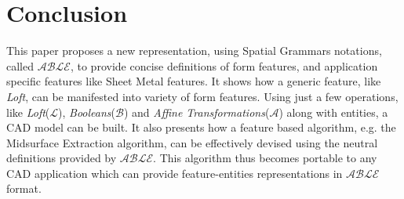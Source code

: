 \section{Conclusion}

This paper proposes a new representation, using Spatial Grammars notations, called {\bf $\mathcal{ABLE}$}, to provide concise definitions of form features, and application specific features like Sheet Metal features. It shows how a generic feature, like {\em Loft}, can be manifested into variety of form features. Using just a few operations, like {\em Loft}({\bf $\mathcal{L}$}), {\em Booleans}({\bf $\mathcal{B}$}) and {\em Affine Transformations}({\bf $\mathcal{A}$}) along with entities, a CAD model can be built. It also presents how a feature based algorithm, e.g. the Midsurface Extraction algorithm, can be effectively devised using the neutral definitions provided by {\bf $\mathcal{ABLE}$}. This algorithm thus becomes portable to any CAD application which can provide feature-entities representations in {\bf $\mathcal{ABLE}$} format.

